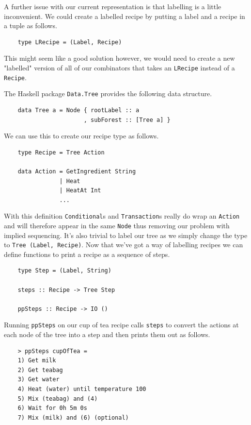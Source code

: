 \documentclass[11pt]{article}
\begin{document}
\medbreak

A further issue with our current representation is that labelling is a little inconvenient.
We could create a labelled recipe by putting a label and a recipe in a tuple as follows.

\begin{lstlisting}
    type LRecipe = (Label, Recipe)
\end{lstlisting}

This might seem like a good solution however, we would need to create a new "labelled"
version of all of our combinators that takes an \texttt{LRecipe} instead of a \texttt{Recipe}.

\medbreak

The Haskell package \texttt{Data.Tree} provides the following data structure.

\begin{lstlisting}
    data Tree a = Node { rootLabel :: a
                       , subForest :: [Tree a] }
\end{lstlisting}

We can use this to create our recipe type as follows.

\begin{lstlisting}
    type Recipe = Tree Action

    data Action = GetIngredient String
                | Heat
                | HeatAt Int
                ...
\end{lstlisting}

With this definition \texttt{Conditional}s and \texttt{Transaction}s really do wrap an
\texttt{Action} and will therefore appear in the same \texttt{Node} thus removing our
problem with implied sequencing. It's also trivial to label our tree as we simply
change the type to \texttt{Tree (Label, Recipe)}. Now that we've got a way of
labelling recipes we can define functions to print a recipe as a sequence of steps.

\begin{lstlisting}
    type Step = (Label, String)

    steps :: Recipe -> Tree Step

    ppSteps :: Recipe -> IO ()
\end{lstlisting}

Running \texttt{ppSteps} on our cup of tea recipe calls \texttt{steps} to convert
the actions at each node of the tree into a step and then prints them out as follows.

\begin{lstlisting}
    > ppSteps cupOfTea =
    1) Get milk
    2) Get teabag
    3) Get water
    4) Heat (water) until temperature 100
    5) Mix (teabag) and (4)
    6) Wait for 0h 5m 0s
    7) Mix (milk) and (6) (optional)
\end{lstlisting}
\end{document}
